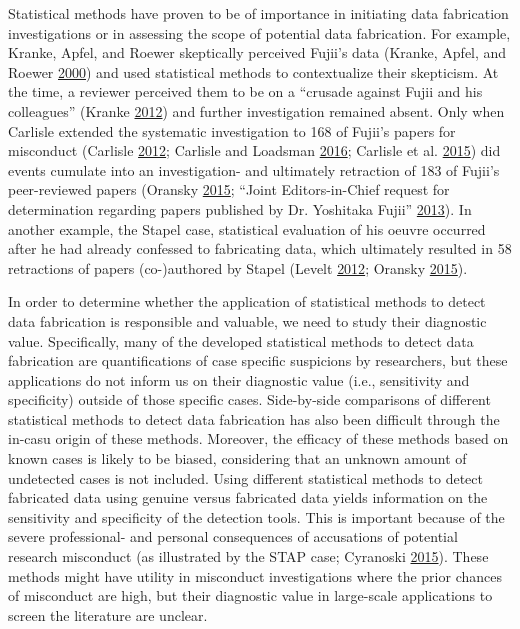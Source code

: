 \documentclass[a5paper]{book}
\begin{document}
Statistical methods have proven to be of importance in initiating data
fabrication investigations or in assessing the scope of potential data
fabrication. For example, Kranke, Apfel, and Roewer skeptically
perceived Fujii's data (Kranke, Apfel, and Roewer
\protect\hyperlink{ref-doi:10.1213ux2f00000539-200004000-00053}{2000})
and used statistical methods to contextualize their skepticism. At the
time, a reviewer perceived them to be on a \enquote{crusade against
Fujii and his colleagues} (Kranke
\protect\hyperlink{ref-doi:10.1111ux2fj.1365-2044.2012.07318.x}{2012})
and further investigation remained absent. Only when Carlisle extended
the systematic investigation to 168 of Fujii's papers for misconduct
(Carlisle
\protect\hyperlink{ref-doi:10.1111ux2fj.1365-2044.2012.07128.x}{2012};
Carlisle and Loadsman
\protect\hyperlink{ref-doi:10.1111ux2fanae.13650}{2016}; Carlisle et al.
\protect\hyperlink{ref-doi:10.1111ux2fanae.13126}{2015}) did events
cumulate into an investigation- and ultimately retraction of 183 of
Fujii's peer-reviewed papers (Oransky
\protect\hyperlink{ref-oransky2015}{2015}; ``Joint Editors-in-Chief
request for determination regarding papers published by Dr. Yoshitaka
Fujii''
\protect\hyperlink{ref-doi:10.1016ux2fj.ijoa.2012.10.001}{2013}). In
another example, the Stapel case, statistical evaluation of his oeuvre
occurred after he had already confessed to fabricating data, which
ultimately resulted in 58 retractions of papers (co-)authored by Stapel
(Levelt \protect\hyperlink{ref-Levelt2012}{2012}; Oransky
\protect\hyperlink{ref-oransky2015}{2015}).

In order to determine whether the application of statistical methods to
detect data fabrication is responsible and valuable, we need to study
their diagnostic value. Specifically, many of the developed statistical
methods to detect data fabrication are quantifications of case specific
suspicions by researchers, but these applications do not inform us on
their diagnostic value (i.e., sensitivity and specificity) outside of
those specific cases. Side-by-side comparisons of different statistical
methods to detect data fabrication has also been difficult through the
in-casu origin of these methods. Moreover, the efficacy of these methods
based on known cases is likely to be biased, considering that an unknown
amount of undetected cases is not included. Using different statistical
methods to detect fabricated data using genuine versus fabricated data
yields information on the sensitivity and specificity of the detection
tools. This is important because of the severe professional- and
personal consequences of accusations of potential research misconduct
(as illustrated by the STAP case; Cyranoski
\protect\hyperlink{ref-doi:10.1038ux2f520600a}{2015}). These methods
might have utility in misconduct investigations where the prior chances
of misconduct are high, but their diagnostic value in large-scale
applications to screen the literature are unclear.
\end{document}

